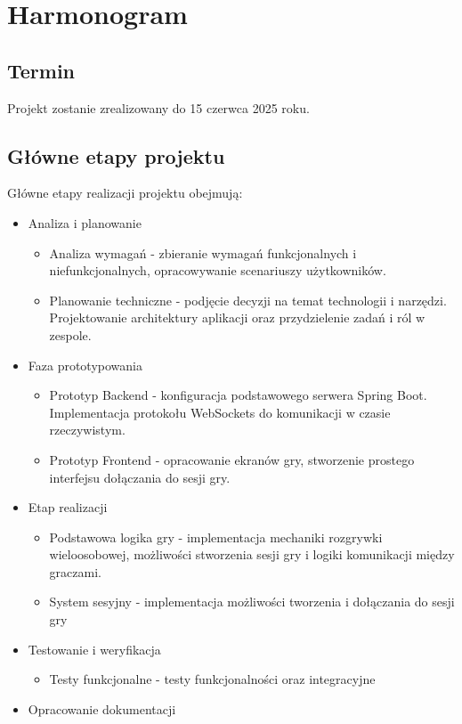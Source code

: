 \documentclass[12pt,a4paper,colorlinks=true,linkcolor=NavyBlue,citecolor=red,urlcolor=NavyBlue]{book}
\begin{document}
\section{Harmonogram}
\subsection{Termin}
Projekt zostanie zrealizowany do 15 czerwca 2025 roku.

\subsection{Główne etapy projektu}
Główne etapy realizacji projektu obejmują:
\begin{itemize}
    \item Analiza i planowanie
    \begin{itemize}
        \item Analiza wymagań - zbieranie wymagań funkcjonalnych i niefunkcjonalnych, opracowywanie scenariuszy użytkowników.
        \item Planowanie techniczne - podjęcie decyzji na temat technologii i narzędzi. Projektowanie architektury aplikacji oraz przydzielenie zadań i ról w zespole.
    \end{itemize}
    \item Faza prototypowania
    \begin{itemize}
        \item Prototyp Backend - konfiguracja podstawowego serwera Spring Boot. Implementacja protokołu WebSockets do komunikacji w czasie rzeczywistym.
        \item Prototyp Frontend - opracowanie ekranów gry, stworzenie prostego interfejsu dołączania do sesji gry.
    \end{itemize}
    \item Etap realizacji
    \begin{itemize}
        \item Podstawowa logika gry - implementacja mechaniki rozgrywki wieloosobowej, możliwości stworzenia sesji gry i logiki komunikacji między graczami.
        \item System sesyjny - implementacja możliwości tworzenia i dołączania do sesji gry
    \end{itemize}
    \item Testowanie i weryfikacja
    \begin{itemize}
        \item Testy funkcjonalne - testy funkcjonalności oraz integracyjne
    \end{itemize}
    \item Opracowanie dokumentacji
\end{itemize}
\end{document}
